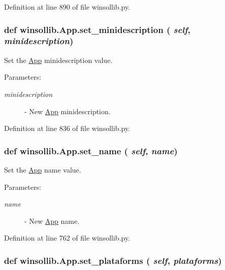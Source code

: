 Definition at line 890 of file winsollib.py.\hypertarget{classwinsollib_1_1App_7187322bf1593b14b2bb60fac8ed07fe}{
\subsubsection[set\_\-minidescription]{\setlength{\rightskip}{0pt plus 5cm}def winsollib.App.set\_\-minidescription ( {\em self},  {\em minidescription})}}
\label{classwinsollib_1_1App_7187322bf1593b14b2bb60fac8ed07fe}


Set the \hyperlink{classwinsollib_1_1App}{App} minidescription value. 

\begin{Desc}
\item[Parameters:]
\begin{description}
\item[{\em minidescription}]- New \hyperlink{classwinsollib_1_1App}{App} minidescription. \end{description}
\end{Desc}


Definition at line 836 of file winsollib.py.\hypertarget{classwinsollib_1_1App_9f37c429b7781d9bc0037b3f581fa717}{
\subsubsection[set\_\-name]{\setlength{\rightskip}{0pt plus 5cm}def winsollib.App.set\_\-name ( {\em self},  {\em name})}}
\label{classwinsollib_1_1App_9f37c429b7781d9bc0037b3f581fa717}


Set the \hyperlink{classwinsollib_1_1App}{App} name value. 

\begin{Desc}
\item[Parameters:]
\begin{description}
\item[{\em name}]- New \hyperlink{classwinsollib_1_1App}{App} name. \end{description}
\end{Desc}


Definition at line 762 of file winsollib.py.\hypertarget{classwinsollib_1_1App_8420ea0b005195177bf4f62dbbaa749f}{
\subsubsection[set\_\-plataforms]{\setlength{\rightskip}{0pt plus 5cm}def winsollib.App.set\_\-plataforms ( {\em self},  {\em plataforms})}}
\label{classwinsollib_1_1App_8420ea0b005195177bf4f62dbbaa749f}


